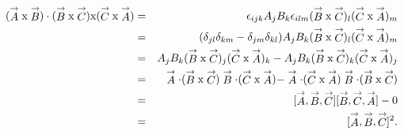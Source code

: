 \begin{eqnarray*}
(\stackrel{\rightarrow}{A} \textup{x} \stackrel{\rightarrow}{B})\cdot (\stackrel{\rightarrow}{B} \textup{x} \stackrel{\rightarrow}{C}) \textup{x} (\stackrel{\rightarrow}{C} \textup{x} \stackrel{\rightarrow}{A})&=&
\epsilon_{ijk}A_jB_k\epsilon_{ilm}(\stackrel{\rightarrow}{B} \textup{x} \stackrel{\rightarrow}{C})_l (\stackrel{\rightarrow}{C} \textup{x} \stackrel{\rightarrow}{A})_m\\
&=&
(\delta_{jl}\delta_{km}-\delta_{jm}\delta_{kl}) A_jB_k(\stackrel{\rightarrow}{B} \textup{x} \stackrel{\rightarrow}{C})_l (\stackrel{\rightarrow}{C} \textup{x} \stackrel{\rightarrow}{A})_m\\
&=&A_jB_k(\stackrel{\rightarrow}{B} \textup{x} \stackrel{\rightarrow}{C})_j (\stackrel{\rightarrow}{C} \textup{x} \stackrel{\rightarrow}{A})_k - A_jB_k(\stackrel{\rightarrow}{B} \textup{x} \stackrel{\rightarrow}{C})_k (\stackrel{\rightarrow}{C} \textup{x} \stackrel{\rightarrow}{A})_j \\
&=& \stackrel{\rightarrow}{A}\cdot(\stackrel{\rightarrow}{B} \textup{x} \stackrel{\rightarrow}{C})\stackrel{\rightarrow}{B}\cdot(\stackrel{\rightarrow}{C} \textup{x} \stackrel{\rightarrow}{A})-
\stackrel{\rightarrow}{A}\cdot(\stackrel{\rightarrow}{C} \textup{x} \stackrel{\rightarrow}{A})\stackrel{\rightarrow}{B}\cdot(\stackrel{\rightarrow}{B} \textup{x} \stackrel{\rightarrow}{C})\\
&=&[\stackrel{\rightarrow}{A} , \stackrel{\rightarrow}{B} , \stackrel{\rightarrow}{C}][\stackrel{\rightarrow}{B} , \stackrel{\rightarrow}{C} , \stackrel{\rightarrow}{A}]-0\\
&=&[\stackrel{\rightarrow}{A} , \stackrel{\rightarrow}{B} , \stackrel{\rightarrow}{C}]^2.
\end{eqnarray*}



\vspace{.1in}


